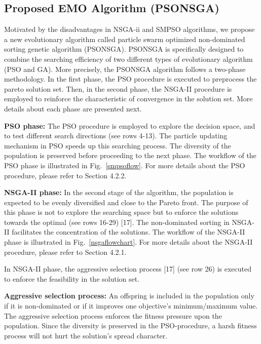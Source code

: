 \documentclass[10pt,journal,compsoc]{IEEEtran}
\newcommand{\Fig}[1]{Fig.~\ref{#1}}
\begin{document}
\subsection{Proposed EMO Algorithm (PSONSGA)}
Motivated by the disadvantages in NSGA-ii and SMPSO algorithms, we propose a new evolutionary algorithm called particle swarm optimized non-dominated sorting genetic algorithm (PSONSGA). PSONSGA is specifically designed to combine the searching efficiency of two different types of evolutionary algorithm (PSO and GA). More precisely, the PSONSGA algorithm follows a two-phase methodology. In the first phase, the PSO procedure is executed to preprocess the pareto solution set. Then, in the second phase, the NSGA-II procedure is employed to reinforce the characteristic of convergence in the solution set. More details about each phase are presented next.


\noindent\textbf{PSO phase:}
The PSO procedure is employed to explore the decision space, and to test different search directions (see rows 4-13). The particle updating mechanism in PSO speeds up this searching process. The diversity of the population is preserved before proceeding to the next phase. The workflow of the PSO phase is illustrated in \Fig{smpsoflow}. For more details about the PSO procedure, please refer to Section 4.2.2. 

\noindent\textbf{NSGA-II phase:}
In the second stage of the algorithm, the population is expected to be evenly diversified and close to the Pareto front. The purpose of this phase is not to explore the searching space but to enforce the solutions towards the optimal (see rows 16-29) [17]. The non-dominated sorting in NSGA-II facilitates the concentration of the solutions. The workflow of the NSGA-II phase is illustrated in \Fig{nsgaflowchart}. For more details about the NSGA-II procedure, please refer to Section 4.2.1. 

In NSGA-II phase, the aggressive selection process [17] (see row 26) is executed to enforce the feasibility in the solution set. 

\noindent\textbf{Aggressive selection process: }
An offspring is included in the population only if it is non-dominated or if it improves one objective’s minimum/maximum value. The aggressive selection process enforces the fitness pressure upon the population. Since the diversity is preserved in the PSO-procedure, a harsh fitness process will not hurt the solution’s spread character. 
\end{document}

